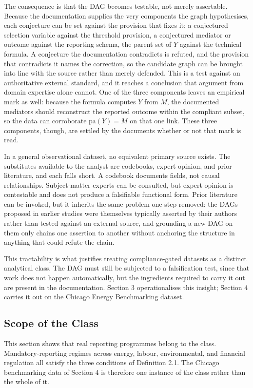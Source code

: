 The consequence is that the DAG becomes testable, not merely assertable. Because the documentation supplies the very components the graph hypothesises, each conjecture can be set against the provision that fixes it: a conjectured selection variable against the threshold provision, a conjectured mediator or outcome against the reporting schema, the parent set of $Y$ against the technical formula. A conjecture the documentation contradicts is refuted, and the provision that contradicts it names the correction, so the candidate graph can be brought into line with the source rather than merely defended. This is a test against an authoritative external standard, and it reaches a conclusion that argument from domain expertise alone cannot. One of the three components leaves an empirical mark as well: because the formula computes $Y$ from $M$, the documented mediators should reconstruct the reported outcome within the compliant subset, so the data can corroborate $\mathrm{pa}(Y) = M$ on that one link. These three components, though, are settled by the documents whether or not that mark is read.

In a general observational dataset, no equivalent primary source exists. The substitutes available to the analyst are codebooks, expert opinion, and prior literature, and each falls short. A codebook documents fields, not causal relationships. Subject-matter experts can be consulted, but expert opinion is contestable and does not produce a falsifiable functional form. Prior literature can be invoked, but it inherits the same problem one step removed: the DAGs proposed in earlier studies were themselves typically asserted by their authors rather than tested against an external source, and grounding a new DAG on them only chains one assertion to another without anchoring the structure in anything that could refute the chain.

This tractability is what justifies treating compliance-gated datasets as a distinct analytical class. The DAG must still be subjected to a falsification test, since that work does not happen automatically, but the ingredients required to carry it out are present in the documentation. Section 3 operationalises this insight; Section 4 carries it out on the Chicago Energy Benchmarking dataset.

\subsection{Scope of the Class}

This section shows that real reporting programmes belong to the class. Mandatory-reporting regimes across energy, labour, environmental, and financial regulation all satisfy the three conditions of Definition 2.1. The Chicago benchmarking data of Section 4 is therefore one instance of the class rather than the whole of it.

